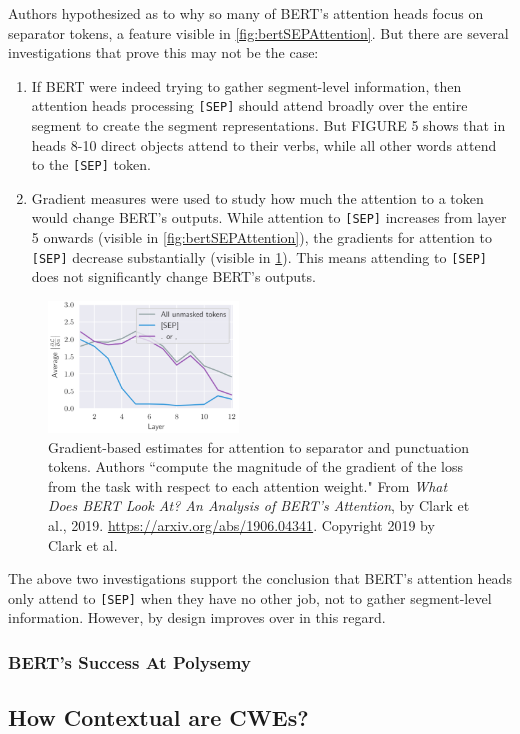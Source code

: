 Authors hypothesized as to why so many of BERT's attention heads focus on separator tokens, a feature visible in \cref{fig:bertSEPAttention}. But there are several investigations that prove this may not be the case: 
\begin{enumerate}
    \item If BERT were indeed trying to gather segment-level information, then attention heads processing \texttt{[SEP]} should attend broadly over the entire segment to create the segment representations. But FIGURE 5 shows that in heads 8-10 direct objects attend to their verbs, while all other words attend to the \texttt{[SEP]} token. 
    
    \item Gradient measures were used to study how much the attention to a token would change BERT's outputs. While attention to \texttt{[SEP]} increases from layer 5 onwards (visible in \cref{fig:bertSEPAttention}), the gradients for attention to \texttt{[SEP]} decrease substantially (visible in \cref{fig:bertGradient}). This means attending to \texttt{[SEP]} does not significantly change BERT's outputs. 
\end{enumerate}


\begin{figure}[h]
\vspace{-5pt}
\centering
\includegraphics[width=0.45\textwidth]{imgs/bert_attentionheads_gradient.png}
\vspace{-5pt}
\caption{\footnotesize Gradient-based estimates for attention to separator and punctuation tokens. Authors ``compute the magnitude of the gradient of the loss from the  task with respect to each attention weight." From \emph{What Does BERT Look At? An Analysis of BERT's Attention}, by Clark et al., 2019. \url{https://arxiv.org/abs/1906.04341}. Copyright 2019 by Clark et al.}
\vspace{-5pt}
\label{fig:bertGradient}
\end{figure}



The above two investigations support the conclusion that BERT's attention heads only attend to \texttt{[SEP]} when they have no other job, not to gather segment-level information. However,  by design improves over  in this regard. 









\subsubsection{BERT's Success At Polysemy} %

\subsection{How Contextual are CWEs?} %
